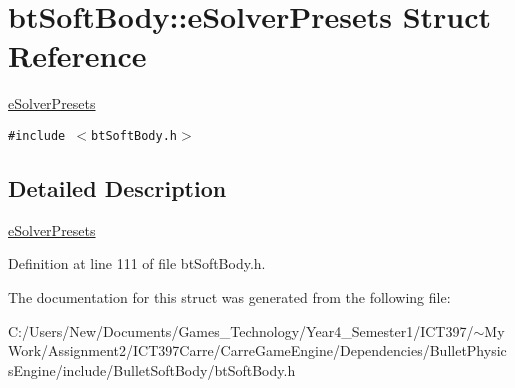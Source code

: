 \hypertarget{structbt_soft_body_1_1e_solver_presets}{
\section{btSoftBody::eSolverPresets Struct Reference}
\label{structbt_soft_body_1_1e_solver_presets}
}
\hyperlink{structbt_soft_body_1_1e_solver_presets}{eSolverPresets}  


{\tt \#include $<$btSoftBody.h$>$}



\subsection{Detailed Description}
\hyperlink{structbt_soft_body_1_1e_solver_presets}{eSolverPresets} 

Definition at line 111 of file btSoftBody.h.

The documentation for this struct was generated from the following file:\begin{CompactItemize}
\item 
C:/Users/New/Documents/Games\_\-Technology/Year4\_\-Semester1/ICT397/$\sim$My Work/Assignment2/ICT397Carre/CarreGameEngine/Dependencies/BulletPhysicsEngine/include/BulletSoftBody/btSoftBody.h\end{CompactItemize}
